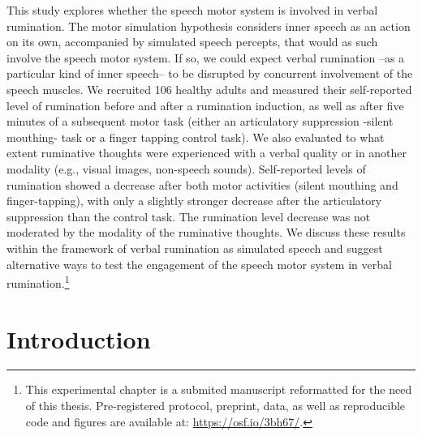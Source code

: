 \documentclass[a4paper,12pt,twoside,openright,oldfontcommands]{memoir}
\let\rmarkdownfootnote\footnote%
\def\footnote{\protect\rmarkdownfootnote}
\newcommand{\initial}[1]{
	\lettrine[lines=3,lhang=0.33,nindent=0em]{
		\color{gray}
     		{\textsc{#1}}}{}}
\begin{document}
\initial{T}his study explores whether the speech motor system is involved in verbal rumination. The motor simulation hypothesis considers inner speech as an action on its own, accompanied by simulated speech percepts, that would as such involve the speech motor system. If so, we could expect verbal rumination --as a particular kind of inner speech-- to be disrupted by concurrent involvement of the speech muscles. We recruited 106 healthy adults and measured their self-reported level of rumination before and after a rumination induction, as well as after five minutes of a subsequent motor task (either an articulatory suppression -silent mouthing- task or a finger tapping control task). We also evaluated to what extent ruminative thoughts were experienced with a verbal quality or in another modality (e.g., visual images, non-speech sounds). Self-reported levels of rumination showed a decrease after both motor activities (silent mouthing and finger-tapping), with only a slightly stronger decrease after the articulatory suppression than the control task. The rumination level decrease was not moderated by the modality of the ruminative thoughts. We discuss these results within the framework of verbal rumination as simulated speech and suggest alternative ways to test the engagement of the speech motor system in verbal rumination.\footnote{This experimental chapter is a submited manuscript reformatted for the need of this thesis. Pre-registered protocol, preprint, data, as well as reproducible code and figures are available at: \url{https://osf.io/3bh67/}.}

\hypertarget{introduction-3}{%
\section{Introduction}\label{introduction-3}}
\end{document}
